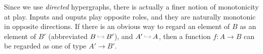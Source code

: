 \begin{wrapfigure}[5]{o}{1.6cm}
    \vspace{-3ex}
\end{wrapfigure}
Since we use \emph{directed} hypergraphs,
     there is actually a finer notion of monotonicity at play. 
Inputs and ouputs play opposite roles, 
    and they are naturally monotonic in opposite directions. 
If there is an obvious way to regard an element of $B$ as an element of $B'$ (abbreviated $B \,{\color{gray}\hookrightarrow}\, B'$),
and $A' \,{\color{gray}\hookrightarrow}\, A$, 
then
a function $f : A \to B$ can be regarded as one of type $A'\to B'$.
